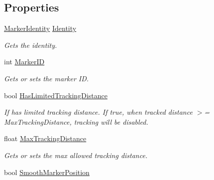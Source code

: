 \subsection*{Properties}
\begin{DoxyCompactItemize}
\item 
\mbox{\hyperlink{class_ximmerse_1_1_slide_in_s_d_k_1_1_marker_identity}{Marker\+Identity}} \mbox{\hyperlink{class_ximmerse_1_1_slide_in_s_d_k_1_1_marker_target_behaviour_aeb1137d3a91792dda621ed8263bf43d4}{Identity}}
\begin{DoxyCompactList}\small\item\em Gets the identity. \end{DoxyCompactList}\item 
int \mbox{\hyperlink{class_ximmerse_1_1_slide_in_s_d_k_1_1_marker_target_behaviour_aeb71a639f06b603ad878907a5611d778}{Marker\+ID}}
\begin{DoxyCompactList}\small\item\em Gets or sets the marker ID. \end{DoxyCompactList}\item 
bool \mbox{\hyperlink{class_ximmerse_1_1_slide_in_s_d_k_1_1_marker_target_behaviour_afe903ec9591fc01ce62a4767058ba594}{Has\+Limited\+Tracking\+Distance}}
\begin{DoxyCompactList}\small\item\em If has limited tracking distance. If true, when tracked distance $>$= Max\+Tracking\+Distance, tracking will be disabled. \end{DoxyCompactList}\item 
float \mbox{\hyperlink{class_ximmerse_1_1_slide_in_s_d_k_1_1_marker_target_behaviour_a3635fc0c79105d1ab92a2943c8584894}{Max\+Tracking\+Distance}}
\begin{DoxyCompactList}\small\item\em Gets or sets the max allowed tracking distance. \end{DoxyCompactList}\item 
bool \mbox{\hyperlink{class_ximmerse_1_1_slide_in_s_d_k_1_1_marker_target_behaviour_af7d332a68d0b0b5d4990d8a359c92f97}{Smooth\+Marker\+Position}}

\end{DoxyCompactItemize}
